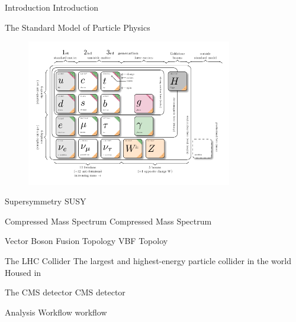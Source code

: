 \makeatletter
  \graphicspath{ {@path} }
\makeatother

\begin{frame}[fragile]{Introduction}
  Introduction
\end{frame}

\begin{frame}[fragile]{The Standard Model of Particle Physics}
  \begin{figure}[htpb]
    \centering
    \includegraphics[width=0.8\textwidth]{fig/standard-model.pdf}
  \end{figure}
\end{frame}

\begin{frame}[fragile]{Supersymmetry}
  SUSY
\end{frame}

\begin{frame}[fragile]{Compressed Mass Spectrum}
  Compressed Mass Spectrum
\end{frame}

\begin{frame}[fragile]{Vector Boson Fusion Topology}
  VBF Topoloy
\end{frame}

\begin{frame}[fragile]{The LHC Collider}
  The largest and highest-energy particle collider in the world
  Housed in 
\end{frame}

\begin{frame}[fragile]{The CMS detector}
  CMS detector
\end{frame}

\begin{frame}[fragile]{Analysis Workflow}
  workflow
\end{frame}

